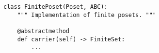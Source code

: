 \par\begin{minipage}{60ex}
\begin{verbatim}
class FinitePoset(Poset, ABC):
    """ Implementation of finite posets. """

    @abstractmethod
    def carrier(self) -> FiniteSet:
        ...
\end{verbatim}
\end{minipage}\par